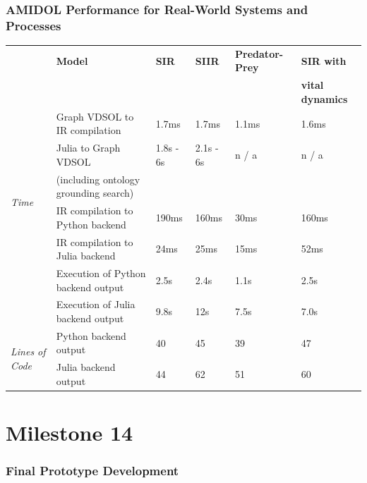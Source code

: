 \documentclass[12pt]{galois-whitepaper}
\begin{document}
\section{AMIDOL Performance for Real-World Systems and Processes}

{ \footnotesize
\begin{tabular}{|llllll|}
 \hline
  & \textbf{Model}	& \textbf{SIR}	& \textbf{SIIR}	& \textbf{Predator-Prey}	&
                                                  \textbf{SIR with}\\
  & & & & & \textbf{vital dynamics}\\
  \hline
   \multirow{6}{*}{\textit{Time}}     & Graph VDSOL to IR compilation	& 1.7ms	& 1.7ms	& 1.1ms	&
                                                                  1.6ms\\
  & Julia to Graph VDSOL
                & 1.8s - 6s	&2.1s - 6s	& n / a	& n / a\\
  & (including ontology grounding search) & & & &\\
        & IR compilation to Python backend	& 190ms	& 160ms & 30ms
                                                                  &
                                                                    160ms\\
        & IR compilation to Julia backend & 24ms	& 25ms	& 15ms
                                                & 52ms\\
        & Execution of Python backend output	& 2.5s	& 2.4s	& 1.1s
                                                & 2.5s\\
	& Execution of Julia backend output	& 9.8s	& 12s	& 7.5s
                                                & 7.0s\\
  \hline
  \hline
  \multirow{2}{*}{\textit{Lines of Code}} & Python backend output & 40
                                        & 45 & 39	& 47\\
        & Julia backend output	& 44	& 62	& 51	& 60\\
  \hline
\end{tabular}
}

\part{Milestone 14}

\section{Final Prototype Development}
\end{document}
